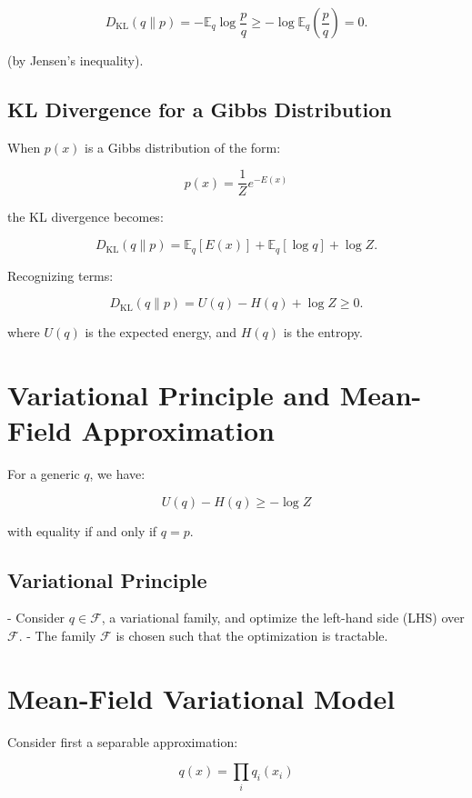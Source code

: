 \documentclass{article}%
\begin{document}
\[
D_{\text{KL}}(q \| p) = - \mathbb{E}_q \log \frac{p}{q} \geq -\log \mathbb{E}_q \left(\frac{p}{q}\right) = 0.
\]

(by Jensen's inequality).

\subsection*{KL Divergence for a Gibbs Distribution}
When \( p(x) \) is a Gibbs distribution of the form:

\[
p(x) = \frac{1}{Z} e^{-E(x)}
\]

the KL divergence becomes:

\[
D_{\text{KL}}(q \| p) = \mathbb{E}_q [E(x)] + \mathbb{E}_q [\log q] + \log Z.
\]

Recognizing terms:

\[
D_{\text{KL}}(q \| p) = U(q) - H(q) + \log Z \geq 0.
\]

where \( U(q) \) is the expected energy, and \( H(q) \) is the entropy.



\section*{Variational Principle and Mean-Field Approximation}

For a generic \( q \), we have:

\[
U(q) - H(q) \geq -\log Z
\]

with equality if and only if \( q = p \).

\subsection*{Variational Principle}
- Consider \( q \in \mathcal{F} \), a variational family, and optimize the left-hand side (LHS) over \( \mathcal{F} \).
- The family \( \mathcal{F} \) is chosen such that the optimization is tractable.


\section*{Mean-Field Variational Model}
Consider first a separable approximation:

\[
q(x) = \prod_i q_i(x_i)
\]
\end{document}
